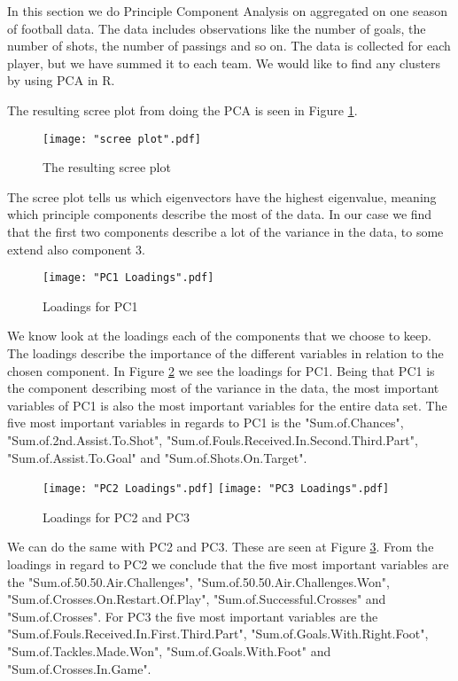 \documentclass[Report.tex]{subfiles}
\begin{document}
In this section we do Principle Component Analysis on aggregated on one season of football data. The data includes observations like the number of goals, the number of shots, the number of passings and so on. The data is collected for each player, but we have summed it to each team. We would like to find any clusters by using PCA in R.

The resulting scree plot from doing the PCA is seen in Figure \ref{fig:scree}.
\begin{figure}
\center
\texttt{[image: "scree plot".pdf]}
\caption{The resulting scree plot}
\label{fig:scree}
\end{figure}
The scree plot tells us which eigenvectors have the highest eigenvalue, meaning which principle components describe the most of the data. In our case we find that the first two components describe a lot of the variance in the data, to some extend also component 3. 

\begin{figure}
\center
\texttt{[image: "PC1 Loadings".pdf]}
\caption{Loadings for PC1}
\label{fig:PC1Loadings}

\end{figure}
We know look at the loadings each of the components that we choose to keep. The loadings describe the importance of the different variables in relation to the chosen component. In Figure \ref{fig:PC1Loadings} we see the loadings for PC1. Being that PC1 is the component describing most of the variance in the data, the most important variables of PC1 is also the most important variables for the entire data set. The five most important variables in regards to PC1 is the "Sum.of.Chances", "Sum.of.2nd.Assist.To.Shot", "Sum.of.Fouls.Received.In.Second.Third.Part", "Sum.of.Assist.To.Goal" and "Sum.of.Shots.On.Target".

\begin{figure}
\center
\texttt{[image: "PC2 Loadings".pdf]}
\texttt{[image: "PC3 Loadings".pdf]}
\caption{Loadings for PC2 and PC3}
\label{fig:PC23Loadings}
\end{figure}

We can do the same with PC2 and PC3. These are seen at Figure \ref{fig:PC23Loadings}. From the loadings in regard to PC2 we conclude that the five most important variables are the "Sum.of.50.50.Air.Challenges", "Sum.of.50.50.Air.Challenges.Won", "Sum.of.Crosses.On.Restart.Of.Play", "Sum.of.Successful.Crosses" and "Sum.of.Crosses".
For PC3 the five most important variables are the "Sum.of.Fouls.Received.In.First.Third.Part", "Sum.of.Goals.With.Right.Foot", "Sum.of.Tackles.Made.Won", "Sum.of.Goals.With.Foot" and "Sum.of.Crosses.In.Game".
\end{document}
